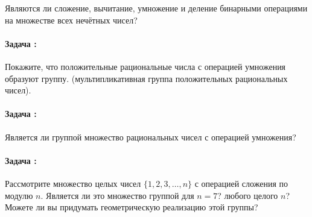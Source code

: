 \documentclass[amsmath,amssymb,12pt]{revtex4}
\newif\ifimportant
\newcommand{\1}{\frac{1}{2}}
\begin{document}
Являются ли сложение, вычитание, умножение и деление бинарными операциями на множестве всех нечётных чисел?


\ifimportant
\medskip
\noindent

Ответ

\fi

\addtocounter{prn}{1}
\vspace{0.3cm}
\paragraph*{Задача \theprn: }

Покажите, что положительные рациональные числа с операцией умножения образуют группу. (мультипликативная группа положительных рациональных чисел).


\ifimportant
\medskip
\noindent

Ответ

\fi

\addtocounter{prn}{1}
\vspace{0.3cm}
\paragraph*{Задача \theprn: }

Является ли группой множество рациональных чисел с операцией умножения?


\ifimportant
\medskip
\noindent

Ответ

\fi

\addtocounter{prn}{1}
\vspace{0.3cm}
\paragraph*{Задача \theprn: }
% 

Рассмотрите множество целых чисел $\{1,2,3,\ldots, n\}$ с операцией сложения по модулю $n$. Является ли это множество группой для $n=7$? любого целого $n$? Можете ли вы придумать геометрическую реализацию этой группы?


\ifimportant
\medskip
\noindent

Ответ

\fi

\addtocounter{prn}{1}
\vspace{0.3cm}
\end{document}
